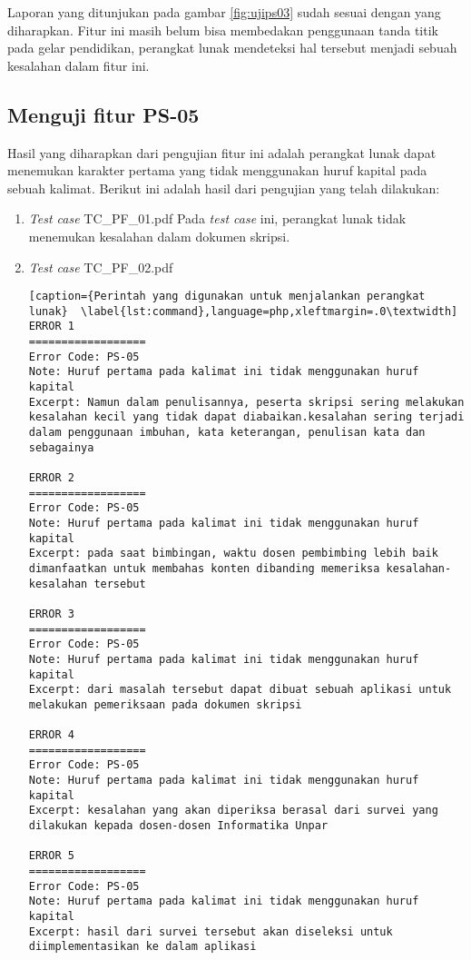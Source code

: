 Laporan yang ditunjukan pada gambar \ref{fig:ujips03} sudah sesuai dengan yang diharapkan. Fitur ini masih belum bisa membedakan penggunaan tanda titik pada gelar pendidikan, perangkat lunak mendeteksi hal tersebut menjadi sebuah kesalahan dalam fitur ini.

\subsection{Menguji fitur PS-05}
Hasil yang diharapkan dari pengujian fitur ini adalah perangkat lunak dapat menemukan karakter pertama yang tidak menggunakan huruf kapital pada sebuah kalimat. Berikut ini adalah hasil dari pengujian yang telah dilakukan:

\begin{enumerate}
	\item \textit{Test case} TC\_PF\_01.pdf
	Pada \textit{test case} ini, perangkat lunak tidak menemukan kesalahan dalam dokumen skripsi.
	
	\item \textit{Test case} TC\_PF\_02.pdf
	
\begin{lstlisting}[caption={Perintah yang digunakan untuk menjalankan perangkat lunak}	\label{lst:command},language=php,xleftmargin=.0\textwidth]
ERROR 1
==================
Error Code: PS-05
Note: Huruf pertama pada kalimat ini tidak menggunakan huruf kapital
Excerpt: Namun dalam penulisannya, peserta skripsi sering melakukan kesalahan kecil yang tidak dapat diabaikan.kesalahan sering terjadi dalam penggunaan imbuhan, kata keterangan, penulisan kata dan sebagainya

ERROR 2
==================
Error Code: PS-05
Note: Huruf pertama pada kalimat ini tidak menggunakan huruf kapital
Excerpt: pada saat bimbingan, waktu dosen pembimbing lebih baik dimanfaatkan untuk membahas konten dibanding memeriksa kesalahan-kesalahan tersebut

ERROR 3
==================
Error Code: PS-05
Note: Huruf pertama pada kalimat ini tidak menggunakan huruf kapital
Excerpt: dari masalah tersebut dapat dibuat sebuah aplikasi untuk melakukan pemeriksaan pada dokumen skripsi

ERROR 4
==================
Error Code: PS-05
Note: Huruf pertama pada kalimat ini tidak menggunakan huruf kapital
Excerpt: kesalahan yang akan diperiksa berasal dari survei yang dilakukan kepada dosen-dosen Informatika Unpar

ERROR 5
==================
Error Code: PS-05
Note: Huruf pertama pada kalimat ini tidak menggunakan huruf kapital
Excerpt: hasil dari survei tersebut akan diseleksi untuk diimplementasikan ke dalam aplikasi


\end{lstlisting}
\end{enumerate}
